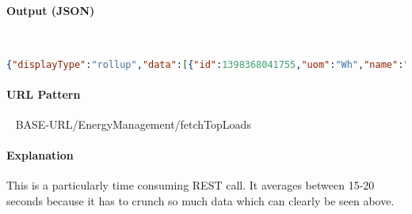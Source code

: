 \documentclass[
10pt, %
letterpaper, %
oneside, %
headinclude,footinclude, %
BCOR5mm, %
]{scrartcl}
\begin{document}
\paragraph{Output (JSON)} ~
\begin{lstlisting}[language=json]
{"displayType":"rollup","data":[{"id":1398368041755,"uom":"Wh","name":"Rack B - (Main Switch Gear (Left+Right) - R1)","value":"478899","isTag":false},{"id":1398368039281,"uom":"Wh","name":"RTU-1 - (Main Switch Gear (Left+Right) - R2)","value":"472782","isTag":false},{"id":1398368003263,"uom":"Wh","name":"Panel PPA - (Main Switch Gear (Left+Right) - L3)","value":"325569","isTag":false},{"id":1398368030859,"uom":"Wh","name":"Panel NLC Lighting - (Main Switch Gear (Left+Right) - R4)","value":"285725","isTag":false},{"id":1398368007959,"uom":"Wh","name":"Comp B6 - (Rack B, Med Temp, Glycol (480) - B6)","value":"280447","isTag":false},{"id":1398368015632,"uom":"Wh","name":"Rack A - (Main Switch Gear (Left+Right) - R5)","value":"279993","isTag":false},{"id":1398368035704,"uom":"Wh","name":"Comp B4 - (Rack B, Med Temp, Glycol (480) - B4)","value":"264469","isTag":false},{"id":1398368010776,"uom":"Wh","name":"ATS - (Main Switch Gear (Left+Right) - L4)","value":"261880","isTag":false},{"id":1398368026413,"uom":"Wh","name":"Comp B5 - (Rack B, Med Temp, Glycol (480) - B5)","value":"257798","isTag":false},{"id":1398368017814,"uom":"Wh","name":"main fan (M10) - (RTU 1 (480) - F1)","value":"225856","isTag":false},{"id":1398368034815,"uom":"Wh","name":"Panel RF (Case Fans) - (208V Distribution Panel (DPA) - 7)","value":"190088","isTag":false}...}
\end{lstlisting}

\paragraph{URL Pattern} 
~\newline
BASE-URL/EnergyManagement/fetchTopLoads

\paragraph{Explanation} This is a particularly time consuming REST call. It averages between 15-20 seconds because it has to crunch so much data which can clearly be seen above.
\end{document}
